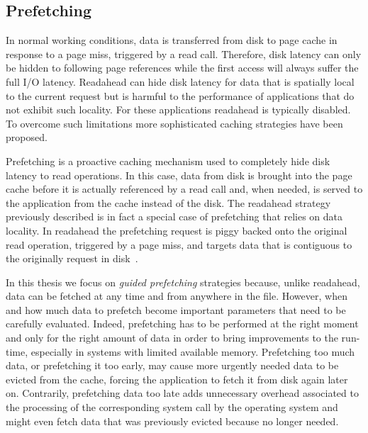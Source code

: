 \subsection{Prefetching}
In normal working conditions, data is transferred from disk to page cache in response to a page miss, triggered by a read call. Therefore, disk latency can only be hidden to following page references while the first access will 
always suffer the full I/O latency. Readahead can hide disk latency for data that is spatially local to the current request but is harmful to the performance of applications that do not exhibit such locality. For these applications 
readahead is typically disabled. To overcome such limitations more sophisticated caching strategies have been proposed.

Prefetching is a proactive caching mechanism used to completely hide disk latency to read operations. In this case, data from disk is brought into the page cache before it is actually referenced by a read call and, when needed, is 
served to the application from the cache instead of the disk. The readahead strategy previously described is in fact a special case of prefetching that relies on data locality. In readahead the prefetching request is piggy backed 
onto the original read operation, triggered by a page miss, and targets data that is contiguous to the originally request in disk~\cite{Bovet2008}.

In this thesis we focus on \textit{guided prefetching} strategies because, unlike readahead, data can be fetched at any time and from anywhere in the file. However, when and how much data to prefetch become important parameters that 
need to be carefully evaluated. Indeed, prefetching has to be performed at the right moment and only for the right amount of data in order to bring improvements to the run-time, especially in systems with limited available memory. 
Prefetching too much data, or prefetching it too early, may cause more urgently needed data to be evicted from the cache, forcing the application to fetch it from disk again later on. Contrarily, prefetching data too late adds 
unnecessary overhead associated to the processing of the corresponding system call by the operating system and might even fetch data that was previously evicted because no longer needed.

